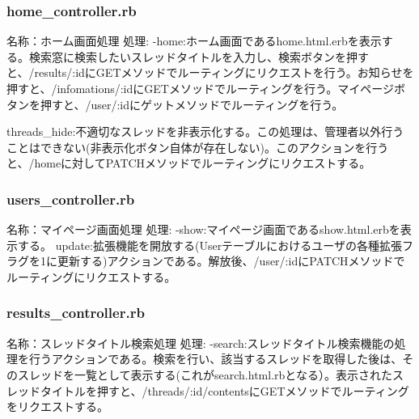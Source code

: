 \documentclass[a4j]{jarticle}
\begin{document}



\subsubsection{home\_controller.rb}
\noindent 名称：ホーム画面処理 \newline
処理:\newline
-home:ホーム画面であるhome.html.erbを表示する。検索窓に検索したいスレッドタイトルを入力し、検索ボタンを押すと、/results/:idにGETメソッドでルーティングにリクエストを行う。お知らせを押すと、/infomations/:idにGETメソッドでルーティングを行う。マイページボタンを押すと、/user/:idにゲットメソッドでルーティングを行う。\newline



threads\_hide:不適切なスレッドを非表示化する。この処理は、管理者以外行うことはできない(非表示化ボタン自体が存在しない)。このアクションを行うと、/homeに対してPATCHメソッドでルーティングにリクエストする。



\subsubsection{users\_controller.rb}
\noindent 名称：マイページ画面処理 \newline
処理:\newline
-show:マイページ画面であるshow.html.erbを表示する。\newline
update:拡張機能を開放する(Userテーブルにおけるユーザの各種拡張フラグを1に更新する)アクションである。解放後、/user/:idにPATCHメソッドでルーティングにリクエストする。


\subsubsection{results\_controller.rb}
\noindent 名称：スレッドタイトル検索処理 \newline
処理:\newline
-search:スレッドタイトル検索機能の処理を行うアクションである。検索を行い、該当するスレッドを取得した後は、そのスレッドを一覧として表示する(これがsearch.html.rbとなる）。表示されたスレッドタイトルを押すと、/threads/:id/contentsにGETメソッドでルーティングをリクエストする。\newline
\end{document}
